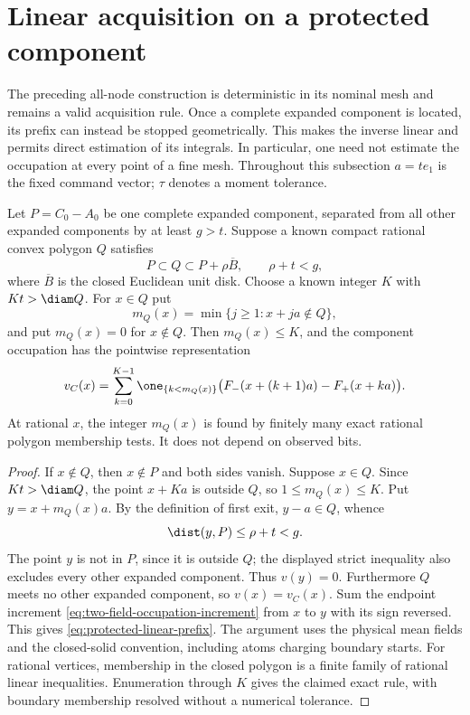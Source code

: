 \section{Linear acquisition on a protected component}
\label{sec:linear-moment-acquisition}
The preceding all-node construction is deterministic in its nominal
mesh and remains a valid acquisition rule. Once a complete expanded
component is located, its prefix can instead be stopped geometrically.
This makes the inverse linear and permits direct estimation of its
integrals. In particular, one need not estimate the occupation at
every point of a fine mesh. Throughout this subsection $a=te_1$ is
the fixed command vector; $\tau$ denotes a moment tolerance.

\begin{lemma}
\label{lem:protected-linear-prefix}
Let $P=C_0-A_0$ be one complete expanded component, separated from
all other expanded components by at least $g>t$. Suppose a known
compact rational convex polygon $Q$ satisfies
\begin{equation}\label{eq:protected-outer-polygon}
 P\subset Q\subset P+\rho\overline B,
                 \qquad \rho+t<g,
\end{equation}
where $\overline B$ is the closed Euclidean unit disk.
Choose a known integer $K$ with $Kt>\diam Q$. For $x\in Q$ put
\[
 m_Q(x)=\min\{j\ge1:x+ja\notin Q\},
\]
and put $m_Q(x)=0$ for $x\notin Q$. Then $m_Q(x)\le K$, and the
component occupation has the pointwise representation
\begin{equation}\label{eq:protected-linear-prefix}
 v_C(x)=\sum_{k=0}^{K-1}\one_{\{k<m_Q(x)\}}
       \bigl(F_-(x+(k+1)a)-F_+(x+ka)\bigr).
\end{equation}
At rational $x$, the integer $m_Q(x)$ is found by finitely many exact
rational polygon membership tests. It does not depend on observed bits.
\end{lemma}
\begin{proof}
If $x\notin Q$, then $x\notin P$ and both sides vanish. Suppose
$x\in Q$. Since $Kt>\diam Q$, the point $x+Ka$ is outside $Q$,
so $1\le m_Q(x)\le K$. Put $y=x+m_Q(x)a$. By the definition of
first exit, $y-a\in Q$, whence
\[
                 \dist(y,P)\le\rho+t<g.
\]
The point $y$ is not in $P$, since it is outside $Q$; the displayed
strict inequality also excludes every other expanded component.
Thus $v(y)=0$. Furthermore $Q$ meets no other expanded component,
so $v(x)=v_C(x)$. Sum the endpoint increment
\eqref{eq:two-field-occupation-increment} from $x$ to $y$ with its
sign reversed. This gives \eqref{eq:protected-linear-prefix}.
The argument uses the physical mean fields and the closed-solid
convention, including atoms charging boundary starts. For rational
vertices, membership in the closed polygon is a finite family of
rational linear inequalities. Enumeration through $K$ gives the
claimed exact rule, with boundary membership resolved without a
numerical tolerance.
\end{proof}

